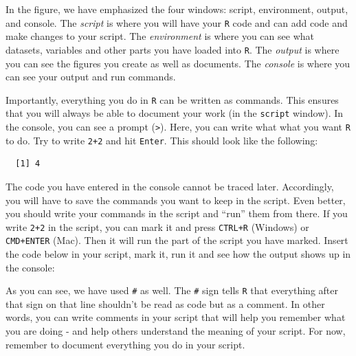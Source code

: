 \documentclass[12pt,oneside]{reedthesis}
\theoremstyle{definition}
\theoremstyle{definition}
\theoremstyle{definition}
\theoremstyle{remark}
\begin{document}
  In the figure, we have emphasized the four windows: script, environment,
  output, and console. The \emph{script} is where you will have your
  \texttt{R} code and can add code and make changes to your script. The
  \emph{environment} is where you can see what datasets, variables and
  other parts you have loaded into \texttt{R}. The \emph{output} is where
  you can see the figures you create as well as documents. The
  \emph{console} is where you can see your output and run commands.
  
  Importantly, everything you do in \texttt{R} can be written as commands.
  This ensures that you will always be able to document your work (in the
  \texttt{script} window). In the console, you can see a prompt
  (\texttt{\textgreater{}}). Here, you can write what what you want
  \texttt{R} to do. Try to write \texttt{2+2} and hit \texttt{Enter}. This
  should look like the following:
  \begin{Shaded}
  \begin{Highlighting}[]
  \OperatorTok{+}
  \end{Highlighting}
  \end{Shaded}
  \begin{verbatim}
  [1] 4
  \end{verbatim}
  The code you have entered in the console cannot be traced later.
  Accordingly, you will have to save the commands you want to keep in the
  script. Even better, you should write your commands in the script and
  ``run'' them from there. If you write \texttt{2+2} in the script, you
  can mark it and press \texttt{CTRL+R} (Windows) or \texttt{CMD+ENTER}
  (Mac). Then it will run the part of the script you have marked. Insert
  the code below in your script, mark it, run it and see how the output
  shows up in the console:
  \begin{Shaded}
  \begin{Highlighting}[]
  \OperatorTok{*}
  \OperatorTok{**}        
  \OperatorTok{**}        
  \NormalTok{(}\NormalTok{)    }
  \end{Highlighting}
  \end{Shaded}
  As you can see, we have used \texttt{\#} as well. The \texttt{\#} sign
  tells \texttt{R} that everything after that sign on that line shouldn't
  be read as code but as a comment. In other words, you can write comments
  in your script that will help you remember what you are doing - and help
  others understand the meaning of your script. For now, remember to
  document everything you do in your script.
  
\end{document}
